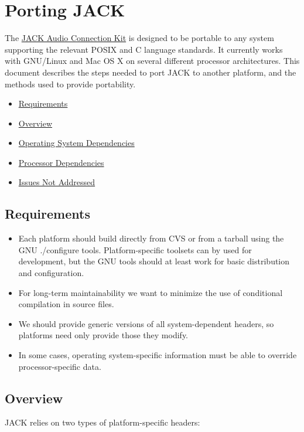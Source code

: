 \hypertarget{porting-guide}{}\section{Porting JACK}\label{porting-guide}
The \hyperlink{index_index}{JACK Audio Connection Kit} is designed to be portable to any system supporting the relevant POSIX and C language standards. It currently works with GNU/Linux and Mac OS X on several different processor architectures. This document describes the steps needed to port JACK to another platform, and the methods used to provide portability.

\begin{itemize}
\item \hyperlink{porting-guide_portrequirements}{Requirements}\item \hyperlink{porting-guide_portoverview}{Overview}\item \hyperlink{porting-guide_portopsys}{Operating System Dependencies}\item \hyperlink{porting-guide_portcpu}{Processor Dependencies}\item \hyperlink{porting-guide_portissues}{Issues Not Addressed}\end{itemize}
\hypertarget{porting-guide_portrequirements}{}\subsection{Requirements}\label{porting-guide_portrequirements}
\begin{itemize}
\item Each platform should build directly from CVS or from a tarball using the GNU {\tt }./configure tools. Platform-specific toolsets can by used for development, but the GNU tools should at least work for basic distribution and configuration.\end{itemize}


\begin{itemize}
\item For long-term maintainability we want to minimize the use of conditional compilation in source files.\end{itemize}


\begin{itemize}
\item We should provide generic versions of all system-dependent headers, so platforms need only provide those they modify.\end{itemize}


\begin{itemize}
\item In some cases, operating system-specific information must be able to override processor-specific data.\end{itemize}
\hypertarget{porting-guide_portoverview}{}\subsection{Overview}\label{porting-guide_portoverview}
JACK relies on two types of platform-specific headers:

